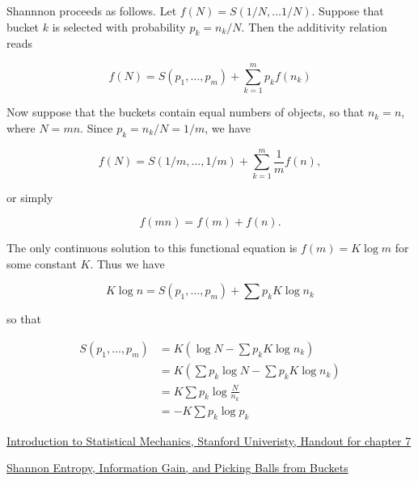 Shannnon proceeds as follows.  Let $f(N) = S(1/N, \ldots 1/N)$.  Suppose that bucket $k$ is selected with probability $p_k = n_k/N$.  Then the additivity relation reads

\begin{equation}
f(N) = S(p_1, \ldots, p_m) + \sum_{k=1}^m p_k f(n_k)
\end{equation}


Now suppose that the buckets contain equal numbers of objects, so that $n_k = n$, where $N = mn$.  Since $p_k = n_k/N = 1/m$, we have

\begin{equation}
f(N) = S(1/m, \ldots, 1/m) + \sum_{k=1}^m \frac{1}{m} f(n),
\end{equation}

or simply


\begin{equation}
f(mn) = f(m) + f(n).
\end{equation}


The only continuous solution to this functional equation is $f(m) = K\log m$
for some constant $K$.  Thus we have

\begin{equation}
K \log n  = S(p_1, \ldots, p_m) + \sum p_k K \log n_k
\end{equation}

so that

\begin{align}
  S(p_1, \ldots, p_m)            & = K(\log N - \sum p_k K \log n_k) \\
             & = K(\sum p_k \log N - \sum p_k K \log n_k) \\
             & = K \sum p_k \log \frac{N}{n_k} \\
             & = - K \sum p_k \log p_k
\end{align}


 \href{http://micro.stanford.edu/~caiwei/me334/Chap7_Entropy_v04.pdf}{Introduction to Statistical Mechanics, Stanford Univeristy, Handout for chapter 7}

\href{https://medium.com/udacity/shannon-entropy-information-gain-and-picking-balls-from-buckets-5810d35d54b4}{Shannon Entropy, Information Gain, and Picking Balls from Buckets}
